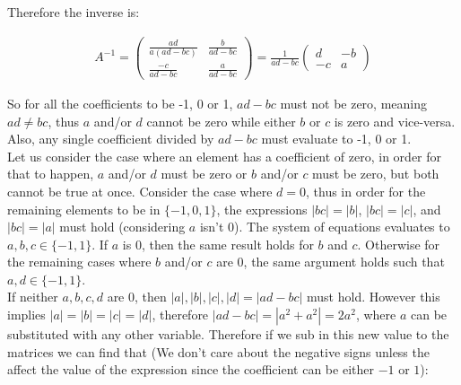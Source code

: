 \documentclass[20pt]{article}
\begin{document}
\begin{text}
    \noindent
    Therefore the inverse is:
    
    \begin{align}
        A^{-1}
        =
        \begin{pmatrix}
            \frac{ad}{a(ad-bc)} & \frac{b}{ad-bc}\\
            \frac{-c}{ad-bc} & \frac{a}{ad-bc}
        \end{pmatrix}
        =
        \frac{1}{ad-bc}
        \begin{pmatrix}
            d & -b\\
            -c & a
        \end{pmatrix}\nonumber
    \end{align}
    
    \noindent
    So for all the coefficients to be -1, 0 or 1, $ad - bc$ must not be zero, meaning $ad \neq bc$, thus $a$ and/or $d$ cannot be zero while either $b$ or $c$ is zero and vice-versa. Also, any single coefficient divided by $ad - bc$ must evaluate to -1, 0 or 1.\\
    
    \noindent
    Let us consider the case where an element has a coefficient of zero, in order for that to happen, $a$ and/or $d$ must be zero or $b$ and/or $c$ must be zero, but both cannot be true at once. Consider the case where $d = 0$, thus in order for the remaining elements to be in $\{-1, 0 , 1\}$, the expressions $|bc| = |b|$, $|bc| = |c|$, and $|bc| = |a|$ must hold (considering $a$ isn't 0). The system of equations evaluates to $a,b,c \in \{-1, 1\}$. If $a$ is 0, then the same result holds for $b$ and $c$. Otherwise for the remaining cases where $b$ and/or $c$ are 0, the same argument holds such that $a,d \in \{-1, 1\}$.\\
    
    \noindent
    If neither $a, b, c, d$ are 0, then $|a|,|b|,|c|,|d| = |ad-bc|$ must hold. However this implies $|a| = |b| = |c| = |d|$, therefore $|ad - bc| = |a^2 + a^2| = 2a^2$, where $a$ can be substituted with any other variable. Therefore if we sub in this new value to the matrices we can find that (We don't care about the negative signs unless the affect the value of the expression since the coefficient can be either $-1$ or $1$):
    

\end{text}
\end{document}
